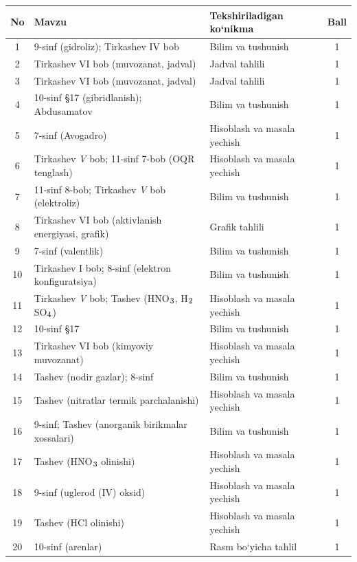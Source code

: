 \documentclass[11pt,a4paper]{article}
\renewcommand{\textsubscript}[1]{\ensuremath{_{\text{\fontsize{8}{8}\selectfont #1}}}}
\begin{document}
{\small\noindent\begin{longtable}{|c|p{7.2cm}|p{5.4cm}|c|}\hline \textbf{No} & \textbf{Mavzu} & \textbf{Tekshiriladigan ko`nikma} & \textbf{Ball}\\\hline
1 & 9-sinf (gidroliz); Tirkashev IV bob & Bilim va tushunish & 1\\\hline
2 & Tirkashev VI bob (muvozanat, jadval) & Jadval tahlili & 1\\\hline
3 & Tirkashev VI bob (muvozanat, jadval) & Jadval tahlili & 1\\\hline
4 & 10-sinf \S{}17 (gibridlanish); Abdusamatov & Bilim va tushunish & 1\\\hline
5 & 7-sinf (Avogadro) & Hisoblash va masala yechish & 1\\\hline
6 & Tirkashev \textit{V} bob; 11-sinf 7-bob (OQR tenglash) & Hisoblash va masala yechish & 1\\\hline
7 & 11-sinf 8-bob; Tirkashev \textit{V} bob (elektroliz) & Bilim va tushunish & 1\\\hline
8 & Tirkashev VI bob (aktivlanish energiyasi, grafik) & Grafik tahlili & 1\\\hline
9 & 7-sinf (valentlik) & Bilim va tushunish & 1\\\hline
10 & Tirkashev I bob; 8-sinf (elektron konfiguratsiya) & Bilim va tushunish & 1\\\hline
11 & Tirkashev \textit{V} bob; Tashev (HNO\textsubscript{3}, H\textsubscript{2}SO\textsubscript{4}) & Hisoblash va masala yechish & 1\\\hline
12 & 10-sinf \S{}17 & Bilim va tushunish & 1\\\hline
13 & Tirkashev VI bob (kimyoviy muvozanat) & Hisoblash va masala yechish & 1\\\hline
14 & Tashev (nodir gazlar); 8-sinf & Bilim va tushunish & 1\\\hline
15 & Tashev (nitratlar termik parchalanishi) & Hisoblash va masala yechish & 1\\\hline
16 & 9-sinf; Tashev (anorganik birikmalar xossalari) & Bilim va tushunish & 1\\\hline
17 & Tashev (HNO\textsubscript{3} olinishi) & Hisoblash va masala yechish & 1\\\hline
18 & 9-sinf (uglerod (IV) oksid) & Hisoblash va masala yechish & 1\\\hline
19 & Tashev (HCl olinishi) & Hisoblash va masala yechish & 1\\\hline
20 & 10-sinf (arenlar) & Rasm bo`yicha tahlil & 1\\\hline

\end{longtable}}
\end{document}
